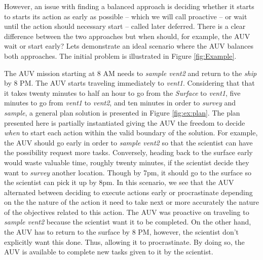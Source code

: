 However, an issue with finding a balanced approach is deciding whether
it starts to starts its action as early as possible -- which we will
call proactive 
-- or wait until the action should necessary start --
called later deferred. 
There is a clear difference between the two approaches
 but when should, for example, the AUV wait
or start early? Lets demonstrate an ideal scenario where the AUV
balances both approaches. The initial problem is illustrated in Figure \ref{fig:Example}. 

The AUV mission starting at 8 AM needs to {\em sample vent2}
and return to the {\em ship} by 8 PM. The AUV starts traveling immediately
to {\em vent1}. Considering that that it takes twenty minutes
to half an hour to go from the {\em Surface} to {\em vent1},  five minutes
to go from {\em vent1} to {\em vent2}, and ten minutes in order
to {\em survey} and {\em sample}, a general plan solution is presented in Figure
\ref{fig:ex:plan}. The plan presented here is partially instantiated
giving the AUV the freedom to decide {\em when} to start each action within
the valid boundary of the solution. For example, the AUV should go
early in order to {\em sample vent2} so that the scientist can have the possibility request 
more tasks. Conversely, heading back to the surface early would waste valuable
time, roughly twenty minutes, if the scientist decide they want to {\em survey} another location. Though by 7pm, it should
go to the surface so the scientist can pick it up by 8pm. In this scenario,
we see that the AUV alternated between deciding to execute actions
early or procrastinate depending on the the nature of the action it
need to take next or more accurately the nature of the objectives 
related to this action. The AUV was proactive on traveling to {\em sample vent2} because the
scientist want it to be completed. On the other hand, the AUV has to return to the surface by
8 PM, however, the scientist don't explicitly want this done. Thus, allowing it to procrastinate. 
By doing so, the AUV is available to complete new tasks given to it by the scientist. 


